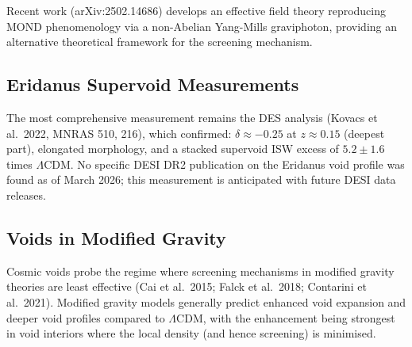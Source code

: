 \documentclass[11pt,a4paper]{article}
\newcommand{\LCDM}{$\Lambda$CDM}
\begin{document}
Recent work (arXiv:2502.14686) develops an effective field theory
reproducing MOND phenomenology via a non-Abelian Yang-Mills
graviphoton, providing an alternative theoretical framework for
the screening mechanism.

\subsection*{Eridanus Supervoid Measurements}

The most comprehensive measurement remains the DES analysis
(Kovacs et al.\ 2022, MNRAS 510, 216), which confirmed:
$\delta \approx -0.25$ at $z \approx 0.15$ (deepest part),
elongated morphology, and a stacked supervoid ISW excess of
$5.2 \pm 1.6$ times \LCDM. No specific DESI DR2 publication
on the Eridanus void profile was found as of March 2026; this
measurement is anticipated with future DESI data releases.

\subsection*{Voids in Modified Gravity}

Cosmic voids probe the regime where screening mechanisms in
modified gravity theories are least effective (Cai et al.\ 2015;
Falck et al.\ 2018; Contarini et al.\ 2021). Modified gravity
models generally predict enhanced void expansion and deeper
void profiles compared to \LCDM, with the enhancement being
strongest in void interiors where the local density (and hence
screening) is minimised.
\end{document}
